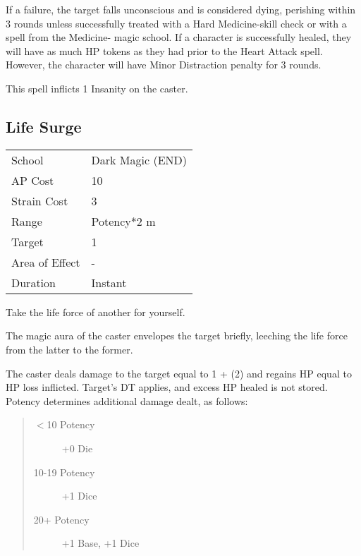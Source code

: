 \documentclass[11pt,a4paper,twocolumn]{book}
\begin{document}
If a failure, the target falls unconscious and is considered dying, perishing within 3 rounds unless successfully treated with a Hard Medicine-skill check or with a spell from the Medicine- magic school. If a character is successfully healed, they will have as much HP tokens as they had prior to the Heart Attack spell. However, the character will have Minor Distraction penalty for 3 rounds.

This spell inflicts 1 Insanity on the caster.


\subsection*{Life Surge}
{
	\begin{tabu} to 75mm{| X[l,4] | X[l,7] |}
		\hline
		School 			& Dark Magic (END) 		\\
		AP Cost	      	& 10 					\\
		Strain Cost     & 3 					\\
		Range     		& Potency*2 m			\\
		Target      	& 1						\\
		Area of Effect  & -  	 				\\
		Duration     	& Instant				\\ \hline
	\end{tabu}
	
}

\medskip

Take the life force of another for yourself.

The magic aura of the caster envelopes the target briefly, leeching the life force from the latter to the former.

The caster deals damage to the target equal to 1 + (2) and regains HP equal to HP loss inflicted. Target's DT applies, and excess HP healed is not stored. Potency determines additional damage dealt, as follows:

\begin{quote}
	\begin{description}
		\item[$<$10 Potency] 	+0 Die
		\item[10-19 Potency] 	+1 Dice
		\item[20+ Potency] 		+1 Base, +1 Dice
	\end{description}	
\end{quote}
\end{document}

